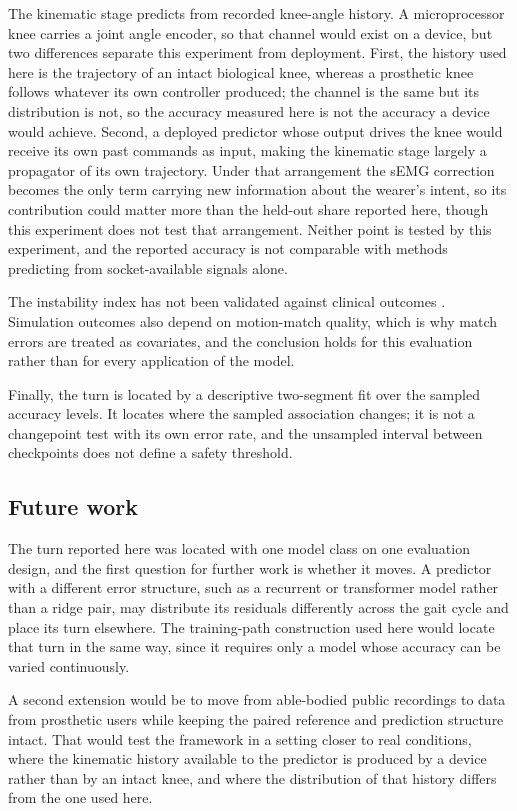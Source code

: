 \documentclass[referee,lineno,pdflatex,sn-vancouver-num]{sn-jnl}
\begin{document}
The kinematic stage predicts from recorded knee-angle history. A microprocessor
knee carries a joint angle encoder, so that channel would exist on a device, but
two differences separate this experiment from deployment. First, the history used
here is the trajectory of an intact biological knee, whereas a prosthetic knee
follows whatever its own controller produced; the channel is the same but its
distribution is not, so the accuracy measured here is not the accuracy a device
would achieve. Second, a deployed predictor whose output drives the knee
would receive its own past commands as input, making the kinematic stage largely
a propagator of its own trajectory. Under that arrangement the sEMG correction
becomes the only term carrying new information about the wearer's intent, so its
contribution could matter more than the held-out share reported here, though
this experiment does not test that arrangement.
Neither point is tested by this experiment, and the reported accuracy is not
comparable with methods predicting from socket-available signals alone.

The instability index has not been validated against clinical outcomes
\cite{hof2005,hof2008,curtze2024}. Simulation
outcomes also depend on motion-match quality, which is why match errors are treated
as covariates, and the conclusion holds for this evaluation
rather than for every application of the model.

Finally, the turn is located by a descriptive two-segment fit over the sampled
accuracy levels. It locates where the sampled association changes; it is not a
changepoint test with its own error rate, and the unsampled interval between
checkpoints does not define a safety threshold.

\subsection{Future work}\label{sec:future}

The turn reported here was located with one model class on one evaluation
design, and the first question for further work is whether it moves. A
predictor with a different error structure, such as a recurrent or
transformer model rather than a ridge pair, may distribute its residuals
differently across the gait cycle and place its turn elsewhere. The
training-path construction used here would locate that turn in the same way,
since it requires only a model whose accuracy can be varied continuously.

A second extension would be to move from able-bodied public recordings to data
from prosthetic users while keeping the paired reference and prediction
structure intact. That would test the framework in a setting closer to real
conditions, where the kinematic history available to the predictor is produced
by a device rather than by an intact knee, and where the distribution of that
history differs from the one used here.
\end{document}
